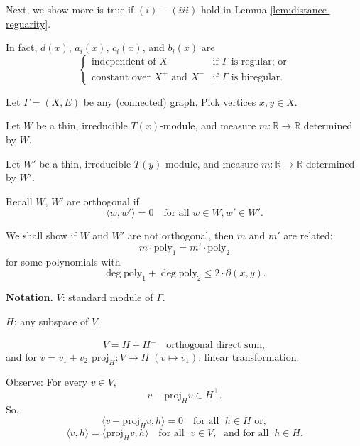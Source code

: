 \documentclass[
]{book}
\theoremstyle{definition}
\theoremstyle{definition}
\theoremstyle{definition}
\theoremstyle{definition}
\theoremstyle{remark}
\begin{document}
Next, we show more is true if \((i)-(iii)\) hold in Lemma \ref{lem:distance-reguarity}.

In fact, \(d(x)\), \(a_i(x)\), \(c_i(x)\), and \(b_i(x)\) are
\[\begin{cases} 
\text{independent of $X$} & \text{if $\Gamma$ is regular; or}\\
\text{constant over $X^+$ and $X^-$} & \text{if $\Gamma$ is biregular.}
\end{cases}\]

Let \(\Gamma = (X, E)\) be any (connected) graph. Pick vertices \(x, y\in X\).

Let \(W\) be a thin, irreducible \(T(x)\)-module, and
measure \(m: \mathbb{R} \to \mathbb{R}\) determined by \(W\).

Let \(W'\) be a thin, irreducible \(T(y)\)-module, and
measure \(m: \mathbb{R} \to \mathbb{R}\) determined by \(W'\).

Recall \(W\), \(W'\) are orthogonal if
\[\langle w, w'\rangle = 0 \quad \text{for all }w\in W, w'\in W'.\]

We shall show if \(W\) and \(W'\) are not orthogonal, then \(m\) and \(m'\) are related:
\[m\cdot \mathrm{poly}_1 = m'\cdot \mathrm{poly}_2\]
for some polynomials with
\[\deg \mathrm{poly}_1 + \deg \mathrm{poly}_2 \leq 2\cdot \partial(x,y).\]

\textbf{Notation.}
\(V\): standard module of \(\Gamma\).

\(H\): any subspace of \(V\).

\[V = H + H^\bot \quad \text{orthogonal direct sum},\]
and for \(v = v_1 + v_2\) \(\mathrm{proj}_H: V\to H \; (v\mapsto v_1)\): linear transformation.

Observe:
For every \(v\in V\),
\[v - \mathrm{proj}_H v \in H^\bot.\]
So,
\[\langle v - \mathrm{proj}_H v, h\rangle = 0 \quad \text{for all }\;h\in H \text{ or},\]
\[\langle v, h\rangle = \langle \mathrm{proj}_H v, h\rangle \quad \text{for all }\;v\in V, \;\text{ and for all }\: h\in H.\]
\end{document}
